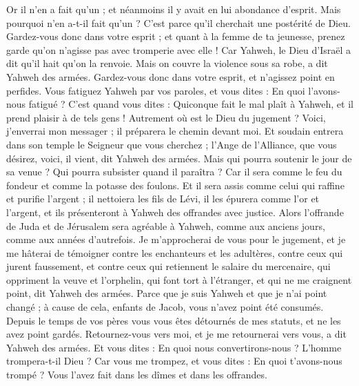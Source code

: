 \begin{multicols}{2}
Or il n'en a fait qu'un ; et néanmoins il y avait en lui abondance d'esprit. Mais pourquoi n'en a-t-il fait qu'un ? C'est parce qu'il cherchait une postérité de Dieu. Gardez-vous donc dans votre esprit ; et quant à la femme de ta jeunesse, prenez garde qu'on n'agisse pas avec tromperie avec elle !
Car Yahweh, le Dieu d'Israël a dit qu'il hait qu'on la renvoie. Mais on couvre la violence sous sa robe, a dit Yahweh des armées. Gardez-vous donc dans votre esprit, et n'agissez point en perfides.
Vous fatiguez Yahweh par vos paroles, et vous dites : En quoi l'avons-nous fatigué ? C'est quand vous dites : Quiconque fait le mal plaît à Yahweh, et il prend plaisir à de tels gens ! Autrement où est le Dieu du jugement ?
\VerseOne{}Voici, j'enverrai mon messager ; il préparera le chemin devant moi. Et soudain entrera dans son temple le Seigneur que vous cherchez ; l'Ange de l'Alliance, que vous désirez, voici, il vient, dit Yahweh des armées.
Mais qui pourra soutenir le jour de sa venue ? Qui pourra subsister quand il paraîtra ? Car il sera comme le feu du fondeur et comme la potasse des foulons.
Et il sera assis comme celui qui raffine et purifie l'argent ; il nettoiera les fils de Lévi, il les épurera comme l'or et l'argent, et ils présenteront à Yahweh des offrandes avec justice.
Alors l'offrande de Juda et de Jérusalem sera agréable à Yahweh, comme aux anciens jours, comme aux années d'autrefois.
Je m'approcherai de vous pour le jugement, et je me hâterai de témoigner contre les enchanteurs et les adultères, contre ceux qui jurent faussement, et contre ceux qui retiennent le salaire du mercenaire, qui oppriment la veuve et l'orphelin, qui font tort à l'étranger, et qui ne me craignent point, dit Yahweh des armées.
Parce que je suis Yahweh et que je n'ai point changé ; à cause de cela, enfants de Jacob, vous n'avez point été consumés.
Depuis le temps de vos pères vous vous êtes détournés de mes statuts, et ne les avez point gardés. Retournez-vous vers moi, et je me retournerai vers vous, a dit Yahweh des armées. Et vous dites : En quoi nous convertirons-nous ?
L'homme trompera-t-il Dieu ? Car vous me trompez, et vous dites : En quoi t'avons-nous trompé ? Vous l'avez fait dans les dîmes et dans les offrandes.

\end{multicols}

